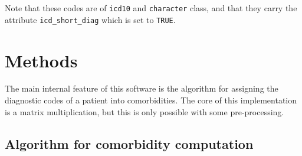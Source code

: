 \documentclass[article]{jss}
\begin{document}
Note that these codes are of \texttt{icd10} and \texttt{character}
class, and that they carry the attribute \texttt{icd\_short\_diag} which
is set to \texttt{TRUE}.

\section{Methods}\label{methods}

The main internal feature of this software is the algorithm for
assigning the diagnostic codes of a patient into comorbidities. The core
of this implementation is a matrix multiplication, but this is only
possible with some pre-processing.

\subsection{Algorithm for comorbidity
computation}\label{algorithm-for-comorbidity-computation}
\end{document}
